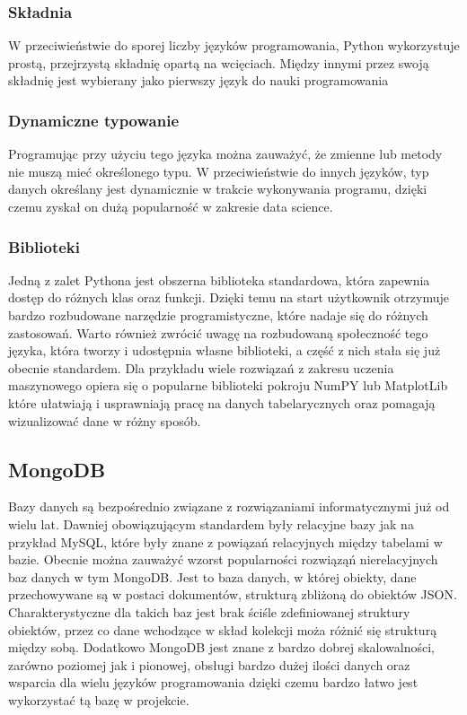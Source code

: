 \subsubsection{Składnia}
W przeciwieństwie do sporej liczby języków programowania, Python wykorzystuje prostą, przejrzystą składnię opartą na wcięciach. Między innymi przez swoją składnię jest wybierany jako pierwszy język do nauki programowania

\subsubsection{Dynamiczne typowanie}
Programując przy użyciu tego języka można zauważyć, że zmienne lub metody nie muszą mieć określonego typu. W przeciwieństwie do innych języków, typ danych określany jest dynamicznie w trakcie wykonywania programu, dzięki czemu zyskał on dużą popularność w zakresie data science.

\subsubsection{Biblioteki}
Jedną z zalet Pythona jest obszerna biblioteka standardowa, która zapewnia dostęp do różnych klas oraz funkcji. Dzięki temu na start użytkownik otrzymuje bardzo rozbudowane narzędzie programistyczne, które nadaje się do różnych zastosowań. Warto również zwrócić uwagę na rozbudowaną społeczność tego języka, która tworzy i udostępnia własne biblioteki, a część z nich stała się już obecnie standardem. Dla przykładu wiele rozwiązań z zakresu uczenia maszynowego opiera się o popularne biblioteki pokroju NumPY lub MatplotLib które ułatwiają i usprawniają pracę na danych tabelarycznych oraz pomagają wizualizować dane w różny sposób.

\subsection{MongoDB}
Bazy danych są bezpośrednio związane z rozwiązaniami informatycznymi już od wielu lat. Dawniej obowiązującym standardem były relacyjne bazy jak na przykład MySQL, które były znane z powiązań relacyjnych między tabelami w bazie. Obecnie można zauważyć wzorst popularności rozwiąząń nierelacyjnych baz danych w tym MongoDB.
Jest to baza danych, w której obiekty, dane przechowywane są w postaci dokumentów, strukturą zbliżoną do obiektów JSON. Charakterystyczne dla takich baz jest brak ściśle zdefiniowanej struktury obiektów, przez co dane wchodzące w skład kolekcji moża różnić się strukturą między sobą.
Dodatkowo MongoDB jest znane z bardzo dobrej skalowalności, zarówno poziomej jak i pionowej, obsługi bardzo dużej ilości danych oraz wsparcia dla wielu języków programowania dzięki czemu bardzo łatwo jest wykorzystać tą bazę w projekcie. 

